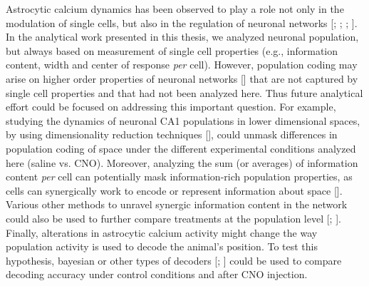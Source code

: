 Astrocytic calcium dynamics has been observed to play a role not only in the modulation of single cells, but also in the regulation of neuronal networks [\cite{fellin2009endogenous}; \cite{szabo2017extensive}; \cite{bellot2018astrocytic}; \cite{mederos2020gabaergic}]. 
In the analytical work presented in this thesis, we analyzed neuronal population, but always based on measurement of single cell properties (e.g., information content, width and center of response \textit{per} cell). 
However, population coding may arise on higher order properties of neuronal networks [\cite{stefanini2020distributed}] that are not captured by single cell properties and that had not been analyzed here. 
Thus future analytical effort could be focused on addressing this important question. 
For example, studying the dynamics of neuronal CA1 populations in lower dimensional spaces, by using dimensionality reduction techniques [\cite{marshel2019cortical}], could unmask differences in population coding of space under the different experimental conditions analyzed here (saline vs. CNO).
Moreover, analyzing the sum (or averages) of information content \textit{per} cell can potentially mask information-rich population properties, as cells can synergically work to encode or represent information about space [\cite{stefanini2020distributed}].
Various other methods to unravel synergic information content in the network could also be used to further compare treatments at the population level [\cite{pola2003exact}; \cite{magri2009toolbox}]. 
Finally, alterations in astrocytic calcium activity might change the way population activity is used to decode the animal's position. 
To test this hypothesis, bayesian or other types of decoders [\cite{zhang1998interpreting}; \cite{shuman2020breakdown}] could be used to compare decoding accuracy under control conditions and after CNO injection. 

